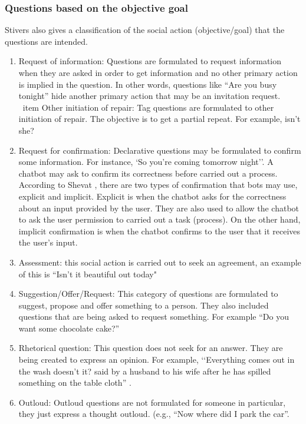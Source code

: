 \documentclass[a4paper,10pt]{article}
\begin{document}
\subsubsection{Questions based on the objective goal}
Stivers also gives a classification of the social action (objective/goal) that the questions are intended.  
\begin{enumerate}
\item Request of information: Questions are formulated to request information when they are asked in order to get information and no other primary action is implied in the question. In other words, questions like “Are you busy tonight” hide another primary action that may be an invitation request. 
\ item Other initiation of repair: Tag questions are formulated to other initiation of repair. The objective is to get a partial repeat. For example,  isn’t she?
\item Request for confirmation: Declarative questions may be formulated to confirm some information. For instance, ‘So you’re coming tomorrow night’’. 
A chatbot may ask to confirm its correctness before carried out a process. \cite{Shevat2017}
According to Shevat \cite{Shevat2017}, there are two types of confirmation that bots may use, explicit and implicit. Explicit is when the chatbot asks for the correctness about an input provided by the user. They are also used to allow the chatbot to ask the user permission to carried out a task (process).  On the other hand, implicit confirmation is when the chatbot confirms to the user that it receives the user’s input. 
\item Assessment: this social action is carried out to seek an agreement, an example of this is “Isn’t it beautiful out today" 	
\item Suggestion/Offer/Request: This category of questions are formulated to suggest, propose and offer something to a person. They also included questions that are being asked to request something. For example “Do you want some chocolate cake?” 
\item Rhetorical question: This question does not seek for an answer. They are being created to express an opinion. For example, ‘‘Everything comes out in the wash doesn’t it? said by a husband to his wife after he has spilled something on the table cloth” \cite{stivers2010coding}.
\item Outloud: Outloud questions are not formulated for someone in particular, they just express a thought outloud. (e.g., “Now where did I park the car”.
\end{enumerate}
\end{document}

